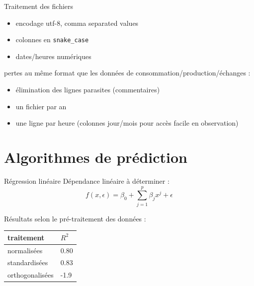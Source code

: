 \begin{frame}[fragile]{Traitement des fichiers}
\protect\hypertarget{traitement-des-fichiers}{}
\begin{itemize}
\tightlist
\item
  encodage utf-8, comma separated values
\item
  colonnes en \texttt{snake\_case}
\item
  dates/heures numériques
\end{itemize}

pertes au même format que les données de
consommation/production/échanges :

\begin{itemize}
\tightlist
\item
  élimination des lignes parasites (commentaires)
\item
  un fichier par an
\item
  une ligne par heure (colonnes jour/mois pour accès facile en
  observation)
\end{itemize}
\end{frame}

\hypertarget{algorithmes-de-pruxe9diction}{%
\section{Algorithmes de prédiction}\label{algorithmes-de-pruxe9diction}}

\begin{frame}{Régression linéaire}
\protect\hypertarget{ruxe9gression-linuxe9aire}{}
Dépendance linéaire à déterminer : \begin{equation}
f(x, \epsilon) = \beta_0 + \sum_{j=1}^p \beta_jx^j + \epsilon
\end{equation}

Résultats selon le pré-traitement des données :

\begin{longtable}[]{@{}ll@{}}
\toprule
\textbf{traitement} & \textbf{\(R^2\)}\tabularnewline
\midrule
\endhead
normalisées & 0.80\tabularnewline
standardisées & 0.83\tabularnewline
orthogonalisées & -1.9\tabularnewline
\bottomrule
\end{longtable}
\end{frame}

